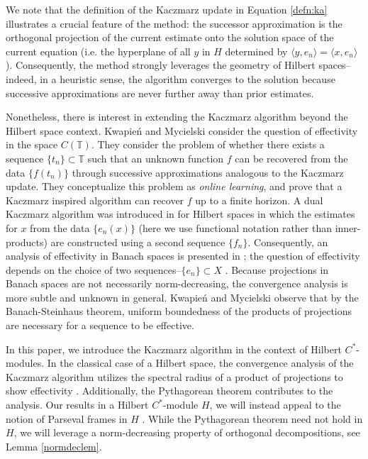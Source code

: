 \documentclass[11pt]{amsart}
\theoremstyle{definition}
\numberwithin{equation}{section}
\begin{document}
We note that the definition of the Kaczmarz update in Equation \eqref{defn:ka} illustrates a crucial feature of the method: the successor approximation is the orthogonal projection of the current estimate onto the solution space of the current equation (i.e. the hyperplane of all $y$ in $H$ determined by $\langle y, e_{n} \rangle = \langle x, e_{n} \rangle$).  Consequently, the method strongly leverages the geometry of Hilbert spaces--indeed, in a heuristic sense, the algorithm converges to the solution because successive approximations are never further away than prior estimates.

Nonetheless, there is interest in extending the Kaczmarz algorithm beyond the Hilbert space context.  Kwapie\'n and Mycielski \cite{Kwapien2001Kaczmarz} consider the question of effectivity in the space $C(\mathbb{T})$.  They consider the problem of whether there exists a sequence $\{ t_{n} \} \subset \mathbb{T}$ such that an unknown function $f$ can be recovered from the data $\{ f(t_{n}) \}$ through successive approximations analogous to the Kaczmarz update.  They conceptualize this problem as \emph{online learning}, and prove that a Kaczmarz inspired algorithm can recover $f$ up to a finite horizon.  A dual Kaczmarz algorithm was introduced in \cite{Aboud2020Dual} for Hilbert spaces in which the estimates for $x$ from the data $\{ e_{n}(x) \}$ (here we use functional notation rather than inner-products) are constructed using a second sequence $\{ f_{n} \}$.  Consequently, an analysis of effectivity in Banach spaces is presented in \cite{Aboud2022Kaczmarz}; the question of effectivity depends on the choice of two sequences--$\{e_{n}\} \subset X$ .  Because projections in Banach spaces are not necessarily norm-decreasing, the convergence analysis is more subtle and unknown in general.  Kwapie\'n and Mycielski observe that by the Banach-Steinhaus theorem, uniform boundedness of the products of projections are necessary for a sequence to be effective.

In this paper, we introduce the Kaczmarz algorithm in the context of Hilbert $C^*$-modules.  In the classical case of a Hilbert space, the convergence analysis of the Kaczmarz algorithm utilizes the spectral radius of a product of projections to show effectivity \cite{Natterer1986Mathematics}.  Additionally, the Pythagorean theorem contributes to the analysis.  Our results in a Hilbert $C^*$-module $H$, we will instead appeal to the notion of Parseval frames in $H$ \cite{Frank2002Frames}.  While the Pythagorean theorem need not hold in $H$, we will leverage a norm-decreasing property of orthogonal decompositions, see Lemma \ref{normdeclem}.
\end{document}
